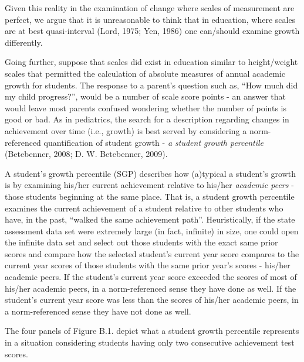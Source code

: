 \documentclass[12pt]{article}
\begin{document}
Given this reality in the examination of change where scales of
measurement are perfect, we argue that it is unreasonable to think that
in education, where scales are at best quasi-interval (Lord, 1975; Yen,
1986) one can/should examine growth differently.

Going further, suppose that scales did exist in education similar to
height/weight scales that permitted the calculation of absolute measures
of annual academic growth for students. The response to a parent's
question such as, ``How much did my child progress?'', would be a number
of scale score points - an answer that would leave most parents confused
wondering whether the number of points is good or bad. As in pediatrics,
the search for a description regarding changes in achievement over time
(i.e., growth) is best served by considering a norm-referenced
quantification of student growth - \emph{a student growth percentile}
(Betebenner, 2008; D. W. Betebenner, 2009).

A student's growth percentile (SGP) describes how (a)typical a student's
growth is by examining his/her current achievement relative to his/her
\emph{academic peers} - those students beginning at the same place. That
is, a student growth percentile examines the current achievement of a
student relative to other students who have, in the past, ``walked the
same achievement path''. Heuristically, if the state assessment data set
were extremely large (in fact, infinite) in size, one could open the
infinite data set and select out those students with the exact same
prior scores and compare how the selected student's current year score
compares to the current year scores of those students with the same
prior year's scores - his/her academic peers. If the student's current
year score exceeded the scores of most of his/her academic peers, in a
norm-referenced sense they have done as well. If the student's current
year score was less than the scores of his/her academic peers, in a
norm-referenced sense they have not done as well.

The four panels of Figure B.1. depict what a student growth percentile
represents in a situation considering students having only two
consecutive achievement test scores.
\end{document}
